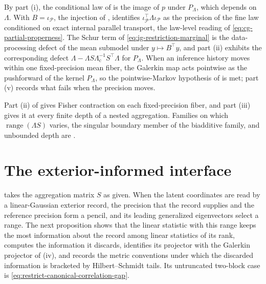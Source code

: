 By part (i), the conditional law of  is
the image of \(p\) under \(P_\Lambda\), which depends on \(\Lambda\). With
\(B=\iota_{\mathcal P}\), the injection of ,
 identifies
\(\iota_{\mathcal P}^\top\Lambda\iota_{\mathcal P}\) as the precision of the fine
law conditioned on exact internal parallel transport, the law-level reading of
\eqref{eq:cg-partial-properness}. The Schur term of
\eqref{eq:ig-restriction-marginal} is the data-processing defect of the mean
submodel under \(y\mapsto B^\top y\), and part (ii) exhibits the corresponding
defect \(\Lambda-\Lambda S\Lambda_{\mathrm c}^{-1}S^\top\Lambda\) for
\(P_\Lambda\). When an inference history moves within one fixed-precision mean
fiber, the Galerkin map acts pointwise as the pushforward of the kernel
\(P_\Lambda\), so the pointwise-Markov hypothesis of
 is met; part (v) records what fails
when the precision moves.

Part (ii) of  gives Fisher contraction on
each fixed-precision fiber, and part (iii) gives it at every finite depth of a
nested aggregation. Families on which \(\operatorname{range}(\Lambda S)\) varies,
the singular boundary member of the biadditive family, and unbounded depth are
.

\section{The exterior-informed interface}
\label{sec:cg-exterior-interface}

 takes the aggregation matrix \(S\) as given.
When the latent coordinates are read by a linear-Gaussian exterior record, the
precision that the record supplies and the reference precision form a pencil,
and its leading generalized eigenvectors select a range. The next proposition
shows that the linear statistic with this range keeps the most information
about the record among linear statistics of its rank, computes the information
it discards, identifies its projector with the Galerkin projector of
(iv), and records the metric conventions
under which the discarded information is bracketed by Hilbert--Schmidt tails.
Its untruncated two-block case is \eqref{eq:restrict-canonical-correlation-gap}.

